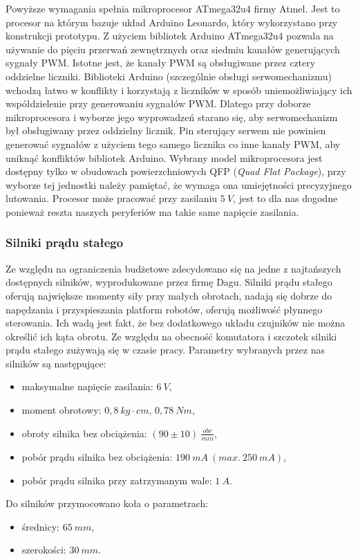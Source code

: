 \documentclass[11pt]{article}
\begin{document}
Powyższe wymagania spełnia mikroprocesor ATmega32u4 firmy Atmel.
Jest to procesor na którym bazuje układ Arduino Leonardo, który wykorzystano przy konstrukcji prototypu.
Z użyciem bibliotek Arduino ATmega32u4 pozwala na używanie do pięciu przerwań zewnętrznych oraz siedmiu kanałów generujących sygnały PWM.
Istotne jest, że kanały PWM są obsługiwane przez cztery oddzielne liczniki. Biblioteki Arduino (szczególnie obsługi serwomechanizmu) wchodzą łatwo w konflikty i korzystają z liczników w sposób uniemożliwiający ich współdzielenie przy generowaniu sygnałów PWM.
Dlatego przy doborze mikroprocesora i wyborze jego wyprowadzeń starano się, aby serwomechanizm był obsługiwany przez oddzielny licznik.
Pin sterujący serwem nie powinien generować sygnałów z użyciem tego samego licznika co inne kanały PWM, aby uniknąć konfliktów bibliotek Arduino.
Wybrany model mikroprocesora jest dostępny tylko w obudowach powierzchniowych QFP (\textit{Quad Flat Package}), przy wyborze tej jednostki należy pamiętać, że wymaga ona umiejętności precyzyjnego lutowania. Procesor może pracować przy zasilaniu $ 5\ V $, jest to dla nas dogodne ponieważ reszta naszych peryferiów ma takie same napięcie zasilania.


\subsubsection{Silniki prądu stałego}
Ze względu na ograniczenia budżetowe zdecydowano się na jedne z najtańszych dostępnych silników, wyprodukowane przez firmę Dagu.
Silniki prądu stałego oferują największe momenty siły przy małych obrotach, nadają się dobrze do napędzania i przyspieszania platform robotów, oferują możliwość płynnego sterowania.
Ich wadą jest fakt, że bez dodatkowego układu czujników nie można określić ich kąta obrotu.
Ze względu na obecność komutatora i szczotek silniki prądu stałego zużywają się w czasie pracy.
Parametry wybranych przez nas silników są następujące:
\begin{itemize}
	\item maksymalne napięcie zasilania: $ 6\ V $,
	\item moment obrotowy: $ 0,8\ kg \cdot cm $, $ 0,78\ Nm $,
	\item obroty silnika bez obciążenia: $ (90 \pm 10) \ \frac{obr}{min} $,
	\item pobór prądu silnika bez obciążenia: $ 190\ mA\ (max.\ 250\ mA) $,
	\item pobór prądu silnika przy zatrzymanym wale: $ 1\ A $.
\end{itemize}
Do silników przymocowano koła o parametrach:
\begin{itemize}
	\item średnicy: $ 65\ mm $,
	\item szerokości: $ 30\ mm $.
\end{itemize}
\end{document}

